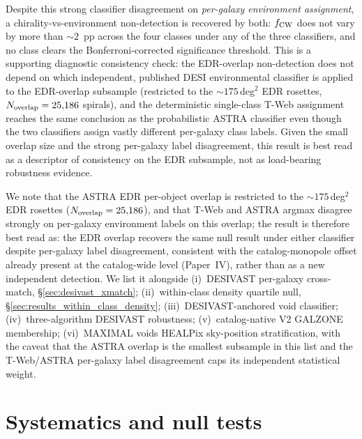 \documentclass[aps,prd,twocolumn,superscriptaddress,showpacs,preprintnumbers,nofootinbib,longbibliography,floatfix]{revtex4-2}
\begin{document}
Despite this strong classifier disagreement on \emph{per-galaxy
environment assignment}, a chirality-vs-environment non-detection
is recovered by both: $f_{\rm CW}$ does not vary by more
than $\sim\!2$~pp across the four classes under any of the three
classifiers, and no class clears the Bonferroni-corrected significance
threshold. This is a supporting diagnostic consistency check: the
EDR-overlap non-detection does not depend on which independent, published DESI environmental
classifier is applied to the EDR-overlap subsample (restricted to the
$\sim\!175$\,deg$^2$ EDR rosettes, $N_{\rm overlap}=25{,}186$ spirals),
and the deterministic single-class T-Web assignment reaches the same
conclusion as the probabilistic ASTRA classifier even though the two
classifiers assign vastly different per-galaxy class labels. Given the
small overlap size and the strong per-galaxy label disagreement, this
result is best read as a descriptor of consistency on the EDR subsample,
not as load-bearing robustness evidence.

We note that the ASTRA EDR
per-object overlap is restricted to the $\sim\!175$\,deg$^2$ EDR
rosettes ($N_{\rm overlap}=25{,}186$), and that T-Web and ASTRA argmax
disagree strongly on per-galaxy environment labels on this overlap;
the result is therefore best read as: the EDR overlap recovers the
same null result under either classifier despite per-galaxy label
disagreement, consistent with the catalog-monopole offset already
present at the catalog-wide level (Paper~IV), rather than as a new
independent detection. We list it alongside (i)~DESIVAST per-galaxy
cross-match, \S\ref{sec:desivast_xmatch}; (ii)~within-class density
quartile null, \S\ref{sec:results_within_class_density};
(iii)~DESIVAST-anchored void classifier;
(iv)~three-algorithm DESIVAST robustness;
(v)~catalog-native V2 GALZONE membership;
(vi)~MAXIMAL voids HEALPix sky-position stratification, with the
caveat that the ASTRA overlap is the smallest subsample in this
list and the T-Web/ASTRA per-galaxy label disagreement caps its
independent statistical weight.

\section{Systematics and null tests}\label{sec:systematics}
\end{document}
